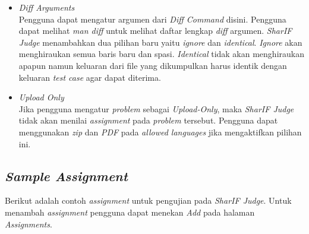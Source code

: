 \begin{itemize}
	\item \textit{Diff Arguments} \\
	Pengguna dapat mengatur argumen dari \textit{Diff Command} disini. Pengguna dapat melihat \textit{man diff} untuk melihat daftar lengkap \textit{diff} argumen. \textit{SharIF Judge} menambahkan dua pilihan baru yaitu \textit{ignore} dan \textit{identical}. \textit{Ignore} akan menghiraukan semua baris baru dan spasi. \textit{Identical} tidak akan menghiraukan apapun namun keluaran dari file yang dikumpulkan harus identik dengan keluaran \textit{test case} agar dapat diterima.
	
	\item \textit{Upload Only} \\
	Jika pengguna mengatur \textit{problem} sebagai \textit{Upload-Only}, maka \textit{SharIF Judge} tidak akan menilai \textit{assignment} pada \textit{problem} tersebut. Pengguna dapat menggunakan \textit{zip} dan \textit{PDF} pada \textit{allowed languages} jika mengaktifkan pilihan ini.
	
\end{itemize}

\subsection{\textit{Sample Assignment}}
\label{subsec:sample_assignment}
Berikut adalah contoh \textit{assignment} untuk pengujian pada \textit{SharIF Judge}. Untuk menambah \textit{assignment} pengguna dapat menekan \textit{Add} pada halaman \textit{Assignments}.

